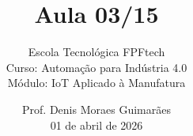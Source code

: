 \title{Aula 03/15}

\subtitle{
\vspace{1.0cm}
Escola Tecnológica FPFtech\\
\vspace{0.5cm}
Curso: Automação para Indústria 4.0\\
\vspace{0.5cm}
Módulo: IoT Aplicado à Manufatura
\vspace{1.0cm}
}

\author{
Prof. Denis Moraes Guimarães\\
\small 01 de abril de 2026
}

\date{}